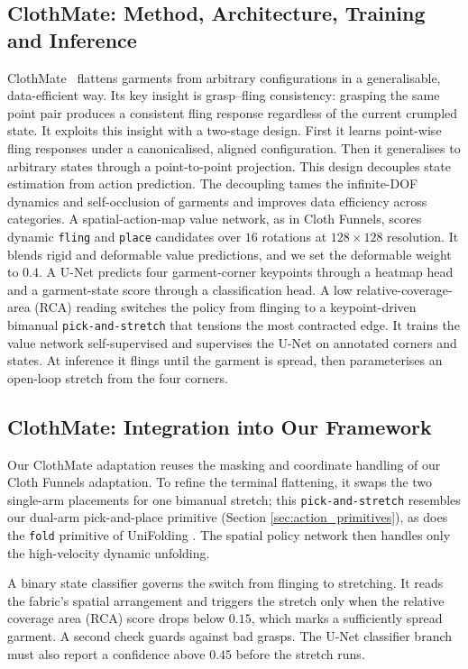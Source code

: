 \documentclass[journal]{IEEEtran}
\begin{document}
\subsection{ClothMate: Method, Architecture, Training and Inference}
ClothMate~\cite{luo2025clothmate} flattens garments from arbitrary configurations in a generalisable, data-efficient way. Its key insight is grasp--fling consistency: grasping the same point pair produces a consistent fling response regardless of the current crumpled state. It exploits this insight with a two-stage design. First it learns point-wise fling responses under a canonicalised, aligned configuration. Then it generalises to arbitrary states through a point-to-point projection. This design decouples state estimation from action prediction. The decoupling tames the infinite-DOF dynamics and self-occlusion of garments and improves data efficiency across categories. A spatial-action-map value network, as in Cloth Funnels, scores dynamic \texttt{fling} and \texttt{place} candidates over $16$ rotations at $128{\times}128$ resolution. It blends rigid and deformable value predictions, and we set the deformable weight to $0.4$. A U-Net predicts four garment-corner keypoints through a heatmap head and a garment-state score through a classification head. A low relative-coverage-area (RCA) reading switches the policy from flinging to a keypoint-driven bimanual \texttt{pick-and-stretch} that tensions the most contracted edge. It trains the value network self-supervised and supervises the U-Net on annotated corners and states. At inference it flings until the garment is spread, then parameterises an open-loop stretch from the four corners.

\subsection{ClothMate: Integration into Our Framework}
Our ClothMate adaptation reuses the masking and coordinate handling of our Cloth Funnels adaptation. To refine the terminal flattening, it swaps the two single-arm placements for one bimanual stretch; this \texttt{pick-and-stretch} resembles our dual-arm pick-and-place primitive (Section \ref{sec:action_primitives}), as does the \texttt{fold} primitive of UniFolding \cite{xue2023unifolding}. The spatial policy network then handles only the high-velocity dynamic unfolding.

A binary state classifier governs the switch from flinging to stretching. It reads the fabric's spatial arrangement and triggers the stretch only when the relative coverage area (RCA) score drops below $0.15$, which marks a sufficiently spread garment. A second check guards against bad grasps. The U-Net classifier branch must also report a confidence above $0.45$ before the stretch runs.
\end{document}
